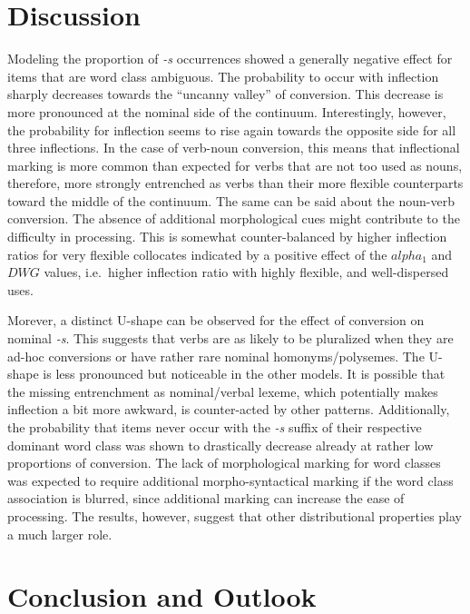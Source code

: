 \documentclass[
]{article}
\begin{document}
\hypertarget{disc}{%
\section{Discussion}\label{disc}}

Modeling the proportion of \emph{-s} occurrences showed a generally
negative effect for items that are word class ambiguous. The probability
to occur with inflection sharply decreases towards the ``uncanny
valley'' of conversion. This decrease is more pronounced at the nominal
side of the continuum. Interestingly, however, the probability for
inflection seems to rise again towards the opposite side for all three
inflections. In the case of verb-noun conversion, this means that
inflectional marking is more common than expected for verbs that are not
too used as nouns, therefore, more strongly entrenched as verbs than
their more flexible counterparts toward the middle of the continuum. The
same can be said about the noun-verb conversion. The absence of
additional morphological cues might contribute to the difficulty in
processing. This is somewhat counter-balanced by higher inflection
ratios for very flexible collocates indicated by a positive effect of
the \(alpha_{1}\) and \(DWG\) values, i.e.~higher inflection ratio with
highly flexible, and well-dispersed uses.

Morever, a distinct U-shape can be observed for the effect of conversion
on nominal \emph{-s}. This suggests that verbs are as likely to be
pluralized when they are ad-hoc conversions or have rather rare nominal
homonyms/polysemes. The U-shape is less pronounced but noticeable in the
other models. It is possible that the missing entrenchment as
nominal/verbal lexeme, which potentially makes inflection a bit more
awkward, is counter-acted by other patterns. Additionally, the
probability that items never occur with the \emph{-s} suffix of their
respective dominant word class was shown to drastically decrease already
at rather low proportions of conversion. The lack of morphological
marking for word classes was expected to require additional
morpho-syntactical marking if the word class association is blurred,
since additional marking can increase the ease of processing. The
results, however, suggest that other distributional properties play a
much larger role.

\hypertarget{conc}{%
\section{Conclusion and Outlook}\label{conc}}
\end{document}
